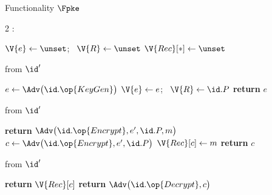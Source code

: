 \begin{interface}[nofloat]{Functionality $\Fpke$ \\
}

{\scriptsize
\setlength{\columnsep}{1.4em}
\begin{multicols}{2}
:
\begin{algorithmic}[1]
\setcounter{contline}{0}\algcont
\State $\V{e} \gets \unset$; \ $\V{R} \gets \unset$
\State $\V{Rec}[*] \gets \unset$
\algsave
\end{algorithmic}
\vspace{1.4ex}

 \quad from $\id'$
\begin{algorithmic}[1]
\algcont
\State $e \gets \Adv\bigl(\id.\op{KeyGen}\bigr)$ \label{ln:pkeadvkey}
  \State $\V{e} \gets e$; \ $\V{R} \gets \id.P$ \label{ln:pkefirst}
\EndIf
\State \textbf{return} $e$
\algsave
\end{algorithmic}
\vspace{1.4ex}

 \quad from $\id'$
\begin{algorithmic}[1]
\algcont
{} \label{ln:pkedomain}
 \label{ln:pkewrongkey}
  \State \textbf{return} $\Adv\bigl(\id.\op{Encrypt}, e', \id.P, m\bigr)$ \label{ln:pkegiveup}
\EndIf
\State $c \gets \Adv\bigl(\id.\op{Encrypt}, e', \id.P\bigr)$ \label{ln:pkehide}
 \label{ln:pkeunique}
\State $\V{Rec}[c] \gets m$
\State \textbf{return} $c$
\algsave
\end{algorithmic}
\vspace{1.4ex}

\columnbreak

 \quad from $\id'$
\begin{algorithmic}[1]
\algcont
{} \label{ln:pkeowner}
  \State \textbf{return} $\V{Rec}[c]$ \label{ln:pkecorrect}
\EndIf
\State \textbf{return} $\Adv\bigl(\id.\op{Decrypt}, c\bigr)$ \label{ln:pkeunknown}
\algsave
\end{algorithmic}
\vspace{1.4ex}


\end{multicols}}
\end{interface}
